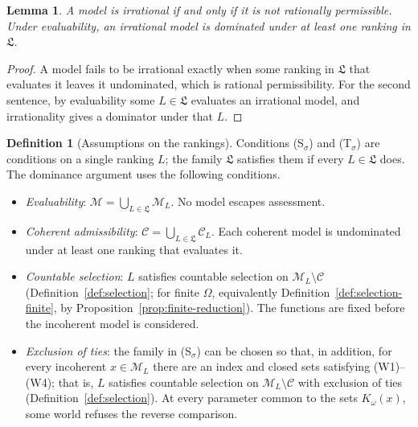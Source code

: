 \documentclass[11pt]{article}
\newtheorem{lemma}[theorem]{Lemma}
\theoremstyle{definition}
\newtheorem{definition}[theorem]{Definition}
\theoremstyle{remark}
\newcommand{\M}{\mathcal M}
\newcommand{\C}{\mathcal C}
\newcommand{\Lf}{\mathfrak L}
\begin{document}
\begin{lemma}\label{lem:complement}
A model is irrational if and only if it is not rationally permissible. Under evaluability, an irrational model is dominated under at least one ranking in $\Lf$.
\end{lemma}
\begin{proof}
A model fails to be irrational exactly when some ranking in $\Lf$ that evaluates it leaves it undominated, which is rational permissibility. For the second sentence, by evaluability some $L\in\Lf$ evaluates an irrational model, and irrationality gives a dominator under that $L$.
\end{proof}

\begin{definition}[Assumptions on the rankings]\label{def:argument-assumptions}
Conditions (S$_\sigma$) and (T$_\sigma$) are conditions on a single ranking $L$; the family $\Lf$ satisfies them if every $L\in\Lf$ does. The dominance argument uses the following conditions.
\begin{itemize}[leftmargin=3.4em,labelsep=0.5em]
\item[\textbf{(E)}] \emph{Evaluability}: $\M=\bigcup_{L\in\Lf}\M_L$. No model escapes assessment.
\item[\textbf{(A)}] \emph{Coherent admissibility}: $\C=\bigcup_{L\in\Lf}\C_L$. Each coherent model is undominated under at least one ranking that evaluates it.
\item[\textbf{(S$_\sigma$)}] \emph{Countable selection}: $L$ satisfies countable selection on $\M_L\setminus\C$ (Definition~\ref{def:selection}{\color{red}; for finite $\Omega$, equivalently Definition~\ref{def:selection-finite}, by Proposition~\ref{prop:finite-reduction}}). The functions are fixed before the incoherent model is considered.
\item[\textbf{(T$_\sigma$)}] \emph{Exclusion of ties}: the family in (S$_\sigma$) can be chosen so that, in addition, for every incoherent $x\in\M_L$ there are an index and closed sets satisfying (W1)--(W4); that is, $L$ satisfies countable selection on $\M_L\setminus\C$ with exclusion of ties (Definition~\ref{def:selection}). At every parameter common to the sets $K_\omega(x)$, some world refuses the reverse comparison.
\end{itemize}
\end{definition}
\end{document}
